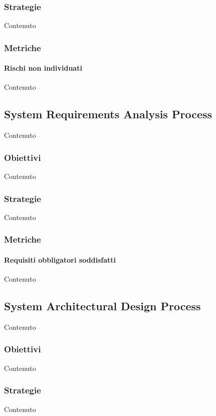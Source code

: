     \subsubsection{Strategie}
    Contenuto


    \subsubsection{Metriche}

    \paragraph{Rischi non individuati}
    Contenuto


    \subsection{System Requirements Analysis Process}
    Contenuto

    \subsubsection{Obiettivi}
    Contenuto

    \subsubsection{Strategie}
    Contenuto


    \subsubsection{Metriche}
    
    \paragraph{Requisiti obbligatori soddisfatti}
    Contenuto


    \subsection{System Architectural Design Process}
    Contenuto

    \subsubsection{Obiettivi}
    Contenuto

    \subsubsection{Strategie}
    Contenuto


